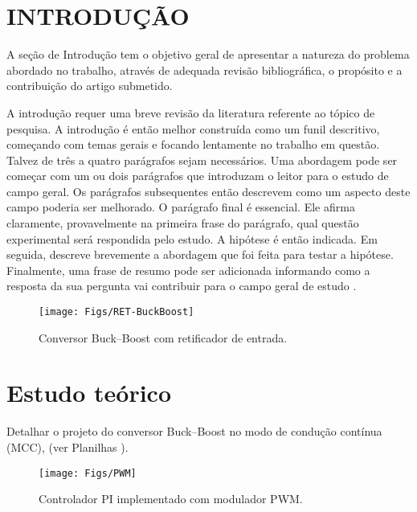 %


\section{INTRODUÇÃO}


A seção de Introdução tem o objetivo geral de apresentar a natureza do problema abordado no trabalho, através de adequada revisão bibliográfica, o propósito e a contribuição do artigo submetido.

A introdução requer uma breve revisão da literatura referente ao tópico de pesquisa. A introdução é então melhor construída como um funil descritivo, começando com temas gerais e focando lentamente no trabalho em questão. Talvez de três a quatro parágrafos sejam necessários. Uma abordagem pode ser começar com um ou dois parágrafos que introduzam o leitor para o estudo de campo geral. Os parágrafos subsequentes então descrevem como um aspecto deste campo poderia ser melhorado. O parágrafo final é essencial. Ele afirma claramente, provavelmente na primeira frase do parágrafo, qual questão experimental será respondida pelo estudo. A hipótese é então indicada. Em seguida, descreve brevemente a abordagem que foi feita para testar a hipótese. Finalmente, uma frase de resumo pode ser adicionada informando como a resposta da sua pergunta vai contribuir para o campo geral de estudo .

\begin{figure}[!h]
	\centering
	\texttt{[image: Figs/RET-BuckBoost]}
	\caption{Conversor Buck--Boost com retificador de entrada.}
	\label{fig:ret-buckboost}
\end{figure}



\section{Estudo teórico}

Detalhar o projeto do conversor Buck--Boost \cite{inep-cccc-2006} no modo de condução contínua (MCC), (ver Planilhas \cite{noauthor_ptc_nodate}).

\begin{figure*}[!h]
	\centering
	\texttt{[image: Figs/PWM]}
	\caption{Controlador PI implementado com modulador PWM.}
	\label{fig:PWM}
\end{figure*}



